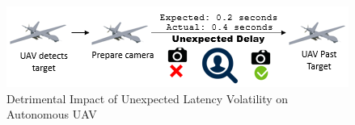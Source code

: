 \documentclass{article}
\begin{document}

\begin{figure}[h]
	\centering
    \includegraphics[scale=0.85]{images/UAVLatencyExampleCamera.png}
    \caption{Detrimental Impact of Unexpected Latency Volatility on Autonomous UAV}
    \label{fig:UAVLatencyExampleCamera}
\end{figure}


\end{document}
